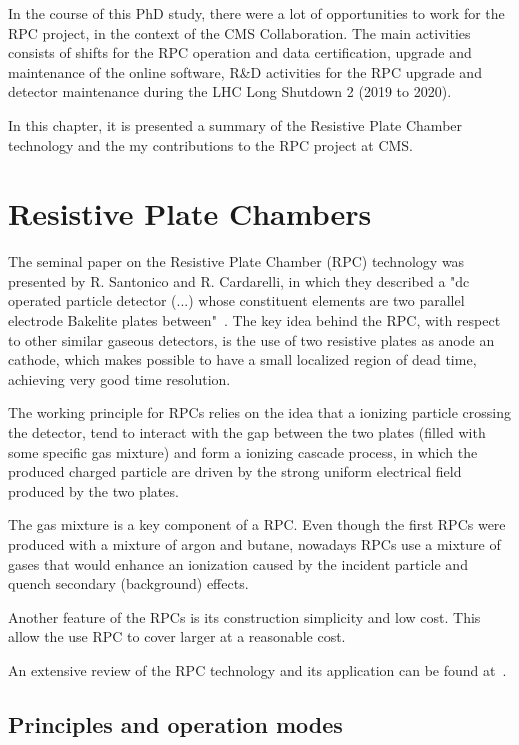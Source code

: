 In the course of this PhD study, there were a lot of opportunities to work for the RPC project, in the context of the CMS Collaboration. The main activities consists of shifts for the RPC operation and data certification, upgrade and maintenance of the online software, R\&D activities for the RPC upgrade and detector maintenance during the LHC Long Shutdown 2 (2019 to 2020).

In this chapter, it is presented a summary of the Resistive Plate Chamber technology and the my contributions to the RPC project at CMS.

\section{Resistive Plate Chambers}

The seminal paper on the Resistive Plate Chamber (RPC) technology was presented by R. Santonico and R. Cardarelli, in which they described a "dc operated particle detector (...) whose constituent elements are two parallel electrode Bakelite plates between"~\cite{rpc_seminal}. The key idea behind the RPC, with respect to other similar gaseous detectors, is the use of two resistive plates as anode an cathode, which makes possible to have a small localized region of dead time, achieving very good time resolution. 

The working principle for RPCs relies on the idea that a ionizing particle crossing the detector, tend to interact with the gap between the two plates (filled with some specific gas mixture) and form a ionizing cascade process, in which the produced charged particle are driven by the strong uniform electrical field produced by the two plates.

The gas mixture is a key component of a RPC. Even though the first RPCs were produced with a mixture of argon and butane, nowadays RPCs use a mixture of gases that would enhance an ionization caused by the incident particle and quench secondary (background) effects.

Another feature of the RPCs is its construction simplicity and low cost. This allow the use RPC to cover larger at a reasonable cost. 

An extensive review of the RPC technology and its application can be found at~\cite{livro_rpc}.

\subsection{Principles and operation modes}

